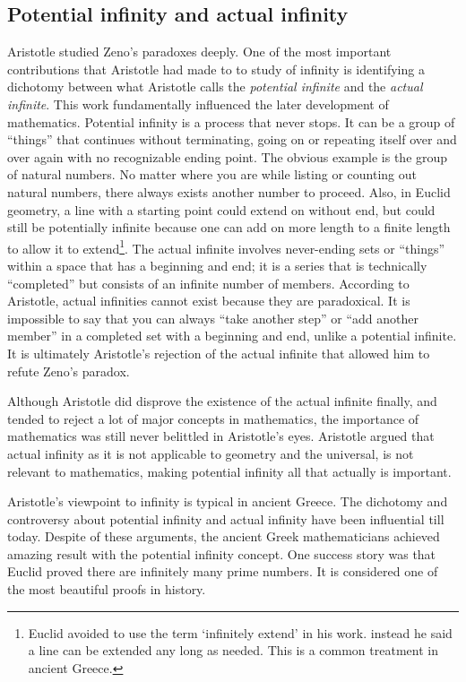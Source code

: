 \documentclass{article}
\begin{document}
\subsection{Potential infinity and actual infinity}
 

Aristotle studied Zeno's paradoxes deeply. One of the most important contributions that Aristotle had made to to study of infinity is identifying a dichotomy between what Aristotle calls the {\em potential infinite} and the {\em actual infinite}. This work fundamentally influenced the later development of mathematics\cite{HanXueTao16}. Potential infinity is a process that never stops. It can be a group of ``things'' that continues without terminating, going on or repeating itself over and over again with no recognizable ending point. The obvious example is the group of natural numbers. No matter where you are while listing or counting out natural numbers, there always exists another number to proceed. Also, in Euclid geometry, a line with a starting point could extend on without end, but could still be potentially infinite because one can add on more length to a finite length to allow it to extend\footnote{Euclid avoided to use the term `infinitely extend' in his work. instead he said a line can be extended any long as needed. This is a common treatment in ancient Greece.}. The actual infinite involves  never-ending sets or ``things'' within a space that has a beginning and end; it is a series that is technically ``completed'' but consists of an infinite number of members. According to Aristotle, actual infinities cannot exist because they are paradoxical. It is impossible to say that you can always ``take another step'' or ``add another member'' in a completed set with a beginning and end, unlike a potential infinite. It is ultimately Aristotle’s rejection of the actual infinite that allowed him to refute Zeno’s paradox.

Although Aristotle did disprove the existence of the actual infinite finally, and tended to reject a lot of major concepts in mathematics, the importance of mathematics was still never belittled in Aristotle’s eyes. Aristotle argued that actual infinity as it is not applicable to geometry and the universal, is not relevant to mathematics, making potential infinity all that actually is important.

Aristotle's viewpoint to infinity is typical in ancient Greece. The dichotomy and controversy about potential infinity and actual infinity have been influential till today. Despite of these arguments, the ancient Greek mathematicians achieved amazing result with the potential infinity concept. One success story was that Euclid proved there are infinitely many prime numbers. It is considered one of the most beautiful proofs in history.
\end{document}
